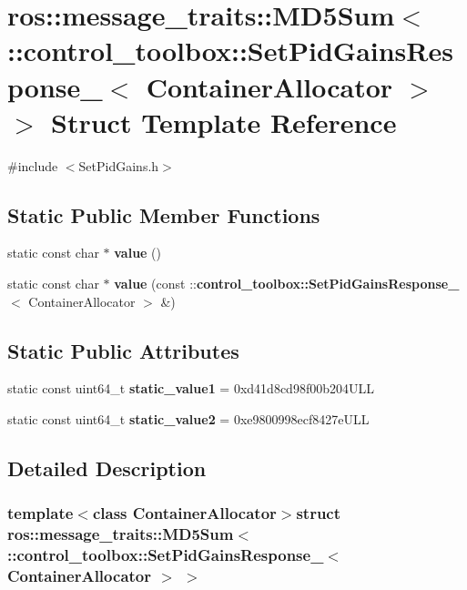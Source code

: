 \section{ros\-:\-:message\-\_\-traits\-:\-:\-M\-D5\-Sum$<$ \-:\-:control\-\_\-toolbox\-:\-:\-Set\-Pid\-Gains\-Response\-\_\-$<$ \-Container\-Allocator $>$ $>$ \-Struct \-Template \-Reference}
\label{structros_1_1message__traits_1_1MD5Sum_3_01_1_1control__toolbox_1_1SetPidGainsResponse___3_01ContainerAllocator_01_4_01_4}


{\ttfamily \#include $<$\-Set\-Pid\-Gains.\-h$>$}

\subsection*{\-Static \-Public \-Member \-Functions}
\begin{DoxyCompactItemize}
\item 
static const char $\ast$ {\bf value} ()
\item 
static const char $\ast$ {\bf value} (const \-::{\bf control\-\_\-toolbox\-::\-Set\-Pid\-Gains\-Response\-\_\-}$<$ \-Container\-Allocator $>$ \&)
\end{DoxyCompactItemize}
\subsection*{\-Static \-Public \-Attributes}
\begin{DoxyCompactItemize}
\item 
static const uint64\-\_\-t {\bf static\-\_\-value1} = 0xd41d8cd98f00b204\-U\-L\-L
\item 
static const uint64\-\_\-t {\bf static\-\_\-value2} = 0xe9800998ecf8427e\-U\-L\-L
\end{DoxyCompactItemize}


\subsection{\-Detailed \-Description}
\subsubsection*{template$<$class Container\-Allocator$>$struct ros\-::message\-\_\-traits\-::\-M\-D5\-Sum$<$ \-::control\-\_\-toolbox\-::\-Set\-Pid\-Gains\-Response\-\_\-$<$ Container\-Allocator $>$ $>$}



